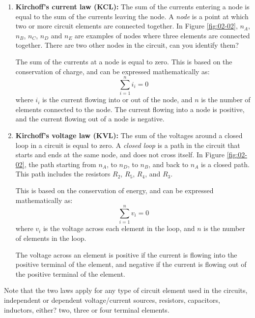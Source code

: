 \begin{enumerate}
    \item \textbf{Kirchoff's current law (KCL):} The sum of the currents entering a node is equal to the sum of the currents leaving the node. A \textit{node} is a point at which two or more circuit elements are connected together. In Figure \ref{fig:02-02}, $n_A$, $n_B$, $n_C$, $n_D$ and $n_E$ are examples of nodes where three elements are connected together. There are two other nodes in the circuit, can you identify them? 
    
    The sum of the currents at a node is equal to zero. This is based on the conservation of charge, and can be expressed mathematically as:
    \begin{equation}
        \sum_{i=1}^{n} i_i = 0
        \label{eq:02-11}
    \end{equation}
    where $i_i$ is the current flowing into or out of the node, and $n$ is the number of elements connected to the node. The current flowing into a node is positive, and the current flowing out of a node is negative.
    
    \item \textbf{Kirchoff's voltage law (KVL):} The sum of the voltages around a closed loop in a circuit is equal to zero. A \textit{closed loop} is a path in the circuit that starts and ends at the same node, and does not cross itself. In Figure \ref{fig:02-02}, the path starting from $n_A$, to $n_D$, to $n_B$, and back to $n_A$ is a closed path. This path includes the resistors $R_2$, $R_5$, $R_4$, and $R_3$. 
    
    This is based on the conservation of energy, and can be expressed mathematically as:
    \begin{equation}
        \sum_{i=1}^{n} v_i = 0
        \label{eq:02-12}
    \end{equation}
    where $v_i$ is the voltage across each element in the loop, and $n$ is the number of elements in the loop.

    The voltage across an element is positive if the current is flowing into the positive terminal of the element, and negative if the current is flowing out of the positive terminal of the element.
\end{enumerate}

Note that the two laws apply for any type of circuit element used in the circuits, independent or dependent voltage/current sources, resistors, capacitors, inductors, either? two, three or four terminal elements.

